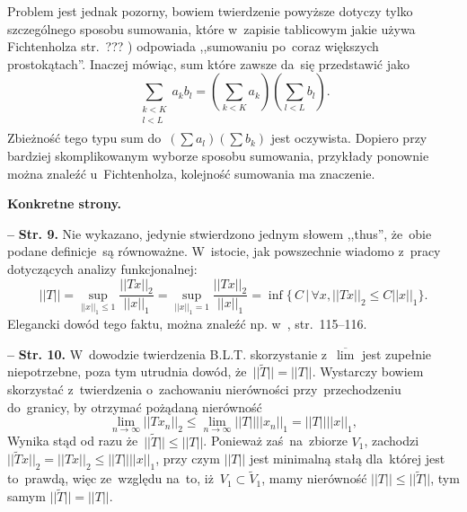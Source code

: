 \documentclass[a4paper,11pt]{article}
\newcommand{\spaceOne}{2em}
\newcommand{\spaceThree}{0.5em}
\newcommand{\fr}{\frac}
\newcommand{\ol}{\overline}
\newcommand{\wt}{\widetilde}
\newcommand{\ra}{\rightarrow}
\newcommand{\Lim}{\lim\limits}
\newcommand{\Limsup}{\ol{\lim}}
\newcommand{\Sum}{\sum\limits}
\newcommand{\norm}[1]{\left|\left| #1 \right|\right|}
\newcommand{\tb}{\textbf}
\newcommand{\noi}{\noindent}
\newcommand{\start}{\noi \tb{--} {}}
\newcommand{\Str}[1]{\tb{Str. #1.}}
\begin{document}
Problem jest jednak pozorny, bowiem twierdzenie powyższe dotyczy tylko
szczególnego sposobu sumowania, które w~zapisie tablicowym jakie używa
Fichtenholza str.~??? \cite{Fichtenholz04}) odpowiada ,,sumowaniu
po~coraz większych prostokątach''. Inaczej mówiąc, sum które zawsze
da~się przedstawić jako
\begin{equation*}
  \Sum_{ \substack{ k < K \\ l < L \\ } } a_{ k } b_{ l }
  = ( \Sum_{ k < K } a_{ k } ) ( \Sum_{ l < L } b_{ l } ).
\end{equation*}
Zbieżność tego typu sum do~$( \Sum a_{ l } ) ( \Sum b_{ k } )$ jest
oczywista. Dopiero przy bardziej skomplikowanym wyborze sposobu
sumowania, przykłady ponownie można znaleźć u~Fichtenholza, kolejność
sumowania ma znaczenie. %

\vspace{\spaceOne}



\noi \tb{Konkretne strony.}

\vspace{\spaceThree}



\start \Str{9} Nie wykazano, jedynie stwierdzono jednym słowem
,,thus'', że~obie podane definicje~są równoważne. W~istocie, jak
powszechnie wiadomo z~pracy dotyczących analizy funkcjonalnej:
\begin{equation*}
  \norm{ T } = \sup_{ \norm{ x }_{ 1 } \leq 1 } \fr{ \norm{ T x }_{ 2 } }
  { \norm{ x }_{ 1 } }
  = \sup_{ \norm{ x }_{ 1 } = 1 } \fr{ \norm{ T x }_{ 2 } }
  { \norm{ x }_{ 1 } } = \inf \{ \, C \, | \, \forall x,
  \norm{ T x }_{ 2 } \leq C \norm{ x }_{ 1 } \}.
\end{equation*}
Elegancki dowód tego faktu, można znaleźć np. w~\cite{Chmielinski04},
str.~115--116. %

\vspace{\spaceThree}


\start \Str{10} W~dowodzie twierdzenia B.L.T. skorzystanie z~$\Limsup$
jest zupełnie niepotrzebne, poza tym utrudnia dowód,
że~$|| \tilde{ T } || = \norm{ T }$. Wystarczy bowiem skorzystać
z~twierdzenia o~zachowaniu nierówności przy~przechodzeniu do~granicy,
by otrzymać pożądaną nierówność
\begin{equation*}
  \Lim_{ n \ra \infty } \norm{ T x_{ n } }_{ 2 }
  \leq \Lim_{ n \ra \infty } \norm{ T } \norm{ x_{ n } }_{ 1 }
  = \norm{ T } \norm{ x }_{ 1 },
\end{equation*}
Wynika stąd od razu że~$|| \wt{ T } || \leq \norm{ T }$. Ponieważ
zaś~na~zbiorze $V_{ 1 }$, zachodzi
$|| \wt{ T } x ||_{ 2 } = \norm{ T x }_{ 2 } \leq \norm{ T } \norm{ x
}_{ 1 }$, przy czym $\norm{ T }$ jest minimalną stałą dla~której jest
to~prawdą, więc ze~względu na~to, iż~$V_{ 1 } \subset \wt{ V }_{ 1 }$,
mamy nierówność $\norm{ T } \leq || \wt{ T } ||$, tym samym
$|| \wt{ T } || = \norm{ T }$. %
\end{document}
